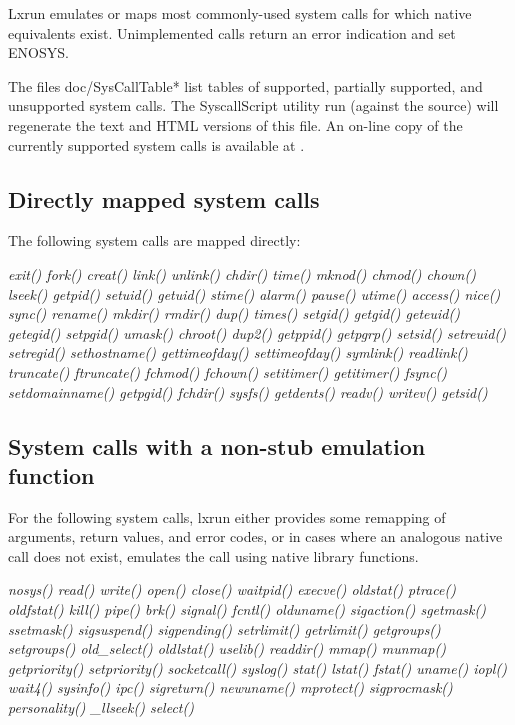 \documentclass[letterpaper]{article}
\begin{document}
Lxrun emulates or maps most commonly-used system calls for which native 
equivalents exist. Unimplemented calls return an error indication and set 
ENOSYS.

The files doc/SysCallTable* list tables of supported, partially supported, 
and unsupported system calls. The SyscallScript utility run (against the 
source) will regenerate the text and HTML versions of this file. An on-line 
copy of the currently supported system calls is available at 
.




\subsection{Directly mapped system calls}

The following system calls are mapped directly:

{\itshape exit() fork() creat() link() unlink() chdir() time() mknod() chmod() chown() 
lseek() getpid() setuid()
getuid() stime() alarm() pause() utime() access() nice() sync() rename() 
mkdir() rmdir() dup() times()
setgid() getgid() geteuid() getegid() setpgid() umask() chroot() dup2() 
getppid() getpgrp() setsid()
setreuid() setregid() sethostname() gettimeofday() settimeofday() symlink() 
readlink()
truncate() ftruncate() fchmod() fchown() setitimer() getitimer() fsync() 
setdomainname()
getpgid() fchdir() sysfs() getdents() readv() writev() getsid()\/}


\subsection{System calls with a non-stub emulation function}

For the following system calls, lxrun either provides some
remapping of arguments, return values, and error codes, or in
cases where an analogous native call does not exist, emulates
the call using native library functions.

{\itshape nosys() read() write() open() close() waitpid() execve() oldstat() ptrace() 
oldfstat() kill() pipe()
brk() signal() fcntl() olduname() sigaction() sgetmask() ssetmask() 
sigsuspend() sigpending()
setrlimit() getrlimit() getgroups() setgroups() old\_select() oldlstat() 
uselib()
readdir() mmap() munmap() getpriority() setpriority() socketcall() syslog() 
stat() lstat()
fstat() uname() iopl() wait4() sysinfo() ipc() sigreturn() newuname() 
mprotect() sigprocmask()
personality() \_llseek() select()\/}
\end{document}
